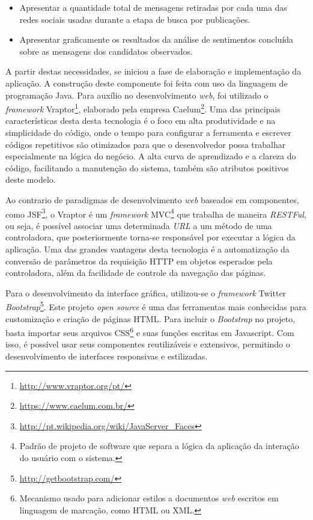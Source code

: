 \begin{itemize}

  \item Apresentar a quantidade total de mensagens retiradas por cada uma das redes sociais usadas durante a etapa de busca por publicações.
  \item Apresentar graficamente os resultados da análise de sentimentos concluída sobre as mensagens dos candidatos observados.

\end{itemize}

A partir destas necessidades, se iniciou a fase de elaboração e implementação da aplicação. A construção deste componente foi feita com uso da linguagem de programação Java. Para auxílio no desenvolvimento \textit{web}, foi utilizado o \textit{framework} Vraptor\footnote{\url{http://www.vraptor.org/pt/}}, elaborado pela empresa Caelum\footnote{\url{https://www.caelum.com.br/}}. Uma das principais características desta desta tecnologia é o foco em alta produtividade e na simplicidade do código, onde o tempo para configurar a ferramenta e escrever códigos repetitivos são otimizados para que o desenvolvedor possa trabalhar especialmente na lógica do negócio. A alta curva de aprendizado e a clareza do código, facilitando a manutenção do sistema, também são atributos positivos deste modelo.

Ao contrario de paradigmas de desenvolvimento \textit{web} baseados em componentes, como JSF\footnote{\url{http://pt.wikipedia.org/wiki/JavaServer_Faces}}, o Vraptor é um \textit{framework} MVC\footnote{Padrão de projeto de software que separa a lógica da aplicação da interação do usuário com o sistema.} que trabalha de maneira \textit{RESTFul}, ou seja, é possível associar uma determinada \textit{URL} a um método de uma controladora, que posteriormente torna-se responsável por executar a lógica da aplicação. Uma das grandes vantagens desta tecnologia é a automatização da conversão de parâmetros da requisição HTTP em objetos esperados pela controladora, além da facilidade de controle da navegação das páginas.

Para o desenvolvimento da interface gráfica, utilizou-se o \textit{framework} Twitter \textit{Bootstrap}\footnote{\url{http://getbootstrap.com/}}. Este projeto \textit{open source} é uma das ferramentas mais conhecidas para customização e criação de páginas HTML. Para incluir o \textit{Bootstrap} no projeto, basta importar seus arquivos CSS\footnote{Mecanismo usado para adicionar estilos a documentos \textit{web} escritos em linguagem de marcação, como HTML ou XML.} e suas funções escritas em Javascript. Com isso, é possível usar seus componentes reutilizáveis e extensivos, permitindo o desenvolvimento de interfaces responsivas e estilizadas.

